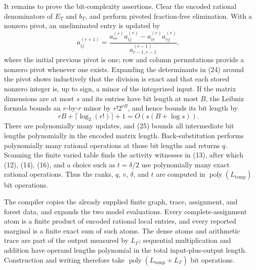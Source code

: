 It remains to prove the bit-complexity assertions.  Clear the encoded rational denominators of \(E_T\) and \(b_T\), and perform pivoted fraction-free elimination.  With a nonzero pivot, an uneliminated entry is updated by
\[
 a_{ij}^{(r+1)}
 =\frac{a_{rr}^{(r)}a_{ij}^{(r)}-a_{ir}^{(r)}a_{rj}^{(r)}}
        {a_{r-1,r-1}^{(r-1)}},                                 \tag{24}
\]
where the initial previous pivot is one; row and column permutations provide a nonzero pivot whenever one exists.  Expanding the determinants in (24) around the pivot shows inductively that the division is exact and that each stored nonzero integer is, up to sign, a minor of the integerized input.  If the matrix dimensions are at most \(s\) and its entries have bit length at most \(B\), the Leibniz formula bounds an \(r\)-by-\(r\) minor by \(r!2^{rB}\), and hence bounds its bit length by
\[
 rB+\lceil\log_2(r!)\rceil+1
 =O\!\left(s(B+\log s)\right).                               \tag{25}
\]
There are polynomially many updates, and (25) bounds all intermediate bit lengths polynomially in the encoded matrix length.  Back-substitution performs polynomially many rational operations at those bit lengths and returns \(q\).  Scanning the finite varied table finds the activity witnesses in (13), after which (12), (14), (16), and a choice such as \(t=\delta/2\) use polynomially many exact rational operations.  Thus the ranks, \(q\), \(v\), \(\delta\), and \(t\) are computed in \(\operatorname{poly}(L_{\mathrm{temp}})\) bit operations.

The compiler copies the already supplied finite graph, trace, assignment, and forest data, and expands the two model evaluations.  Every complete-assignment atom is a finite product of encoded rational local entries, and every reported marginal is a finite exact sum of such atoms.  The dense atoms and arithmetic trace are part of the output measured by \(L_\Gamma\); sequential multiplication and addition have operand lengths polynomial in the total input-plus-output length.  Construction and writing therefore take \(\operatorname{poly}(L_{\mathrm{temp}}+L_\Gamma)\) bit operations.


